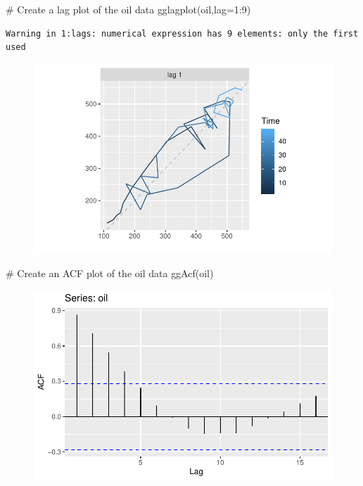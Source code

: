 \documentclass[
  letterpaper,
  DIV=11,
  numbers=noendperiod]{scrartcl}
\newenvironment{Shaded}{\begin{snugshade}}{\end{snugshade}}
\newcommand{\AttributeTok}[1]{\textcolor[rgb]{0.40,0.45,0.13}{#1}}
\newcommand{\CommentTok}[1]{\textcolor[rgb]{0.37,0.37,0.37}{#1}}
\newcommand{\DecValTok}[1]{\textcolor[rgb]{0.68,0.00,0.00}{#1}}
\newcommand{\FunctionTok}[1]{\textcolor[rgb]{0.28,0.35,0.67}{#1}}
\newcommand{\NormalTok}[1]{\textcolor[rgb]{0.00,0.23,0.31}{#1}}
\newcommand{\SpecialCharTok}[1]{\textcolor[rgb]{0.37,0.37,0.37}{#1}}
\begin{document}
\begin{Shaded}
\begin{Highlighting}[]
\CommentTok{\# Create a lag plot of the oil data}
\FunctionTok{gglagplot}\NormalTok{(oil,}\AttributeTok{lag=}\DecValTok{1}\SpecialCharTok{:}\DecValTok{9}\NormalTok{)}
\end{Highlighting}
\end{Shaded}

\begin{verbatim}
Warning in 1:lags: numerical expression has 9 elements: only the first used
\end{verbatim}

\begin{figure}[H]

{\centering \includegraphics{forecasting_datacamp_ex_files/figure-pdf/unnamed-chunk-4-2.pdf}

}

\end{figure}

\begin{Shaded}
\begin{Highlighting}[]
\CommentTok{\# Create an ACF plot of the oil data}
\FunctionTok{ggAcf}\NormalTok{(oil)}
\end{Highlighting}
\end{Shaded}

\begin{figure}[H]

{\centering \includegraphics{forecasting_datacamp_ex_files/figure-pdf/unnamed-chunk-4-3.pdf}

}

\end{figure}
\end{document}
